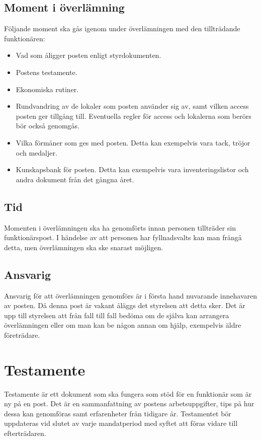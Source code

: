 \documentclass[]{dsekkallelse}
\begin{document}
\subsection{Moment i överlämning}
Följande moment ska gås igenom under överlämningen med den tillträdande funktionären:
\begin{itemize}
    \item Vad som åligger posten enligt styrdokumenten.
    \item Postens testamente.
    \item Ekonomiska rutiner.
    \item Rundvandring av de lokaler som posten använder sig av, samt vilken access posten ger tillgång till. Eventuella regler för access och lokalerna som berörs bör också genomgås.
    \item Vilka förmåner som ges med posten. Detta kan exempelvis vara tack, tröjor och medaljer.
    \item Kunskapsbank för posten. Detta kan exempelvis vara inventeringslistor och andra dokument från det gångna året.
\end{itemize}
\subsection{Tid}
Momenten i överlämningen ska ha genomförts innan personen tillträder sin funktionärspost. I händelse av att personen har fyllnadsvalts kan man frångå detta, men överlämningen ska ske snarast möjligen.

\subsection{Ansvarig}
Ansvarig för att överlämningen genomförs är i första hand nuvarande innehavaren av posten. Då denna post är vakant åläggs det styrelsen att detta sker. Det är upp till styrelsen att från fall till fall bedöma om de själva kan arrangera överlämningen eller om man kan be någon annan om hjälp, exempelvis äldre företrädare.

\section{Testamente}
Testamente är ett dokument som ska fungera som stöd för en funktionär som är ny på en post. Det är en sammanfattning av postens arbetsuppgifter, tips på hur dessa kan genomföras samt erfarenheter från tidigare år. Testamentet bör uppdateras vid slutet av varje mandatperiod med syftet att föras vidare till efterträdaren.
\end{document}
